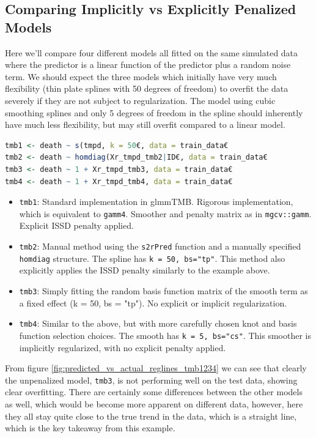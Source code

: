 \documentclass[12pt, twoside,hidelinks]{article}
\theoremstyle{definition}
\numberwithin{equation}{section}
\begin{document}
\subsection{Comparing Implicitly vs Explicitly Penalized Models}\label{sec:penunpencompare:compare}

Here we'll compare four different models all fitted on the same simulated data where the predictor is a linear function of the predictor plus a random noise term. We should expect the three models which initially have very much flexibility (thin plate splines with 50 degrees of freedom) to overfit the data severely if they are not subject to regularization. The model using cubic smoothing splines and only 5 degrees of freedom in the spline should inherently have much less flexibility, but may still overfit compared to a linear model.

\begin{lstlisting}[language=R]
tmb1 <- death ~ s(tmpd, k = 50€, data = train_data€
tmb2 <- death ~ homdiag(Xr_tmpd_tmb2|ID€, data = train_data€
tmb3 <- death ~ 1 + Xr_tmpd_tmb3, data = train_data€
tmb4 <- death ~ 1 + Xr_tmpd_tmb4, data = train_data€
\end{lstlisting}

\begin{itemize}
    \setlength{\itemsep}{1em} %
    \item \texttt{tmb1}: Standard implementation in glmmTMB. Rigorous implementation, which is equivalent to \texttt{gamm4}. Smoother and penalty matrix as in \texttt{mgcv::gamm}. Explicit ISSD penalty applied.
    \item \texttt{tmb2}: Manual method using the \texttt{s2rPred} function and a manually specified \texttt{homdiag} structure. The spline has \texttt{k = 50, bs="tp"}. This method also explicitly applies the ISSD penalty similarly to the example above. 
    \item \texttt{tmb3}: Simply fitting the random basis function matrix of the smooth term as a fixed effect (k = 50, bs = "tp"). No explicit or implicit regularization.
    \item \texttt{tmb4}: Similar to the above, but with more carefully chosen knot and basis function selection choices. The smooth has \texttt{k = 5, bs="cs"}. This smoother is implicitly regularized, with no explicit penalty applied. 
\end{itemize}

From figure \ref{fig:predicted_vs_actual_reglines_tmb1234} we can see  that clearly the unpenalized model, \texttt{tmb3}, is not performing well on the test data, showing clear overfitting. There are certainly some differences between the other models as well, which would be become more apparent on different data, however, here they all stay quite close to the true trend in the data, which is a straight line, which is the key takeaway from this example.
\end{document}
